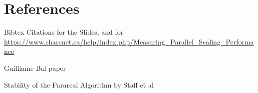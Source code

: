 \documentclass[letterpaper,12pt]{article}
\begin{document}
\section{References}

Bibtex Citations for the Slides, and for \url{https://www.sharcnet.ca/help/index.php/Measuring_Parallel_Scaling_Performance}

%
%

Guilliame Bal paper

Stability of the Parareal Algorithm by Staff et al
\end{document}
